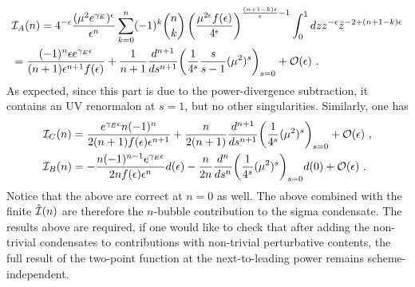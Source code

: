 \documentclass[a4paper,11pt]{article}
\begin{document}
\begin{align}
&{\cal I}_A(n)=4^{-\epsilon} \frac{(\mu^2e^{\gamma_E})^{\epsilon}}{\epsilon^n}\sum_{k=0}^n(-1)^k\binom{n}{k}\left(\frac{\mu^{2\epsilon}f(\epsilon)}{4^{\epsilon}}\right)^{\frac{(n+1-k)\epsilon}{\epsilon}-1}\int_0^1 dz z^{-\epsilon}\bar z^{-2+(n+1-k)\epsilon} \nonumber \\ 
&=\frac{(-1)^n\epsilon e^{\gamma_E \epsilon}}{(n+1)\epsilon^{n+1}f(\epsilon)}+\frac{1}{n+1}\frac{d^{n+1}}{ds^{n+1}}\bigg(\frac{1}{4^s}\frac{s}{s-1}(\mu^2)^s\bigg)_{s=0}+{\cal O}(\epsilon) \ .
\end{align}
As expected, since this part is due to the power-divergence subtraction, it contains an UV renormalon at $s=1$, but no other singularities.  Similarly, one has
\begin{align}
&{\cal I}_C(n)=\frac{e^{\gamma_E \epsilon}n(-1)^n}{2(n+1)f(\epsilon)\epsilon^{n+1}}+\frac{n}{2(n+1)}\frac{d^{n+1}}{ds^{n+1}}\bigg(\frac{1}{4^s}(\mu^2)^s\bigg)_{s=0}+{\cal O}(\epsilon) \ , \\
&{\cal I}_B(n)=-\frac{n(-1)^{n-1}e^{\gamma_E \epsilon}}{2nf(\epsilon)\epsilon^{n}}d(\epsilon)-\frac{n}{2n}\frac{d^{n}}{ds^{n}}\bigg(\frac{1}{4^s}(\mu^2)^s\bigg)_{s=0}d(0)+{\cal O}(\epsilon) \ .
\end{align}
Notice that the above are correct at $n=0$ as well. The above combined with the finite $\hat {\cal I}(n)$ are therefore the $n$-bubble contribution to the sigma condensate. The results above are required, if one would like to check that after adding the non-trivial condensates to contributions with non-trivial perturbative contents, the full result of the two-point function at the next-to-leading power remains scheme-independent. 
\end{document}
